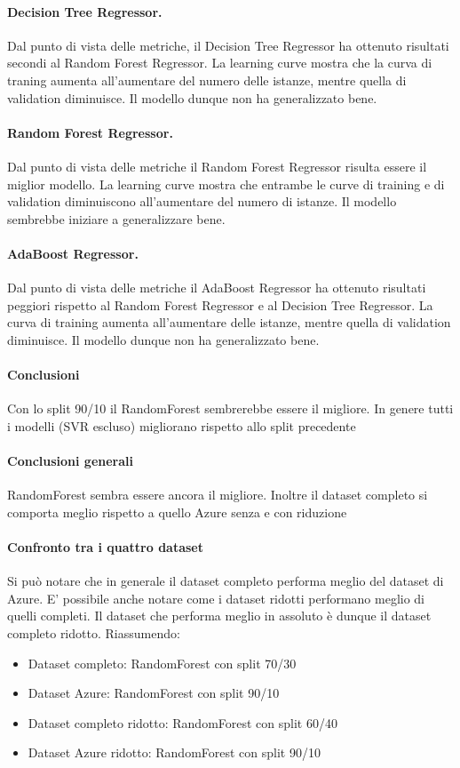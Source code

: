 \paragraph{\textbf{Decision Tree Regressor}.}
Dal punto di vista delle metriche, il Decision Tree Regressor ha ottenuto risultati secondi al Random Forest Regressor.
La learning curve mostra che la curva di traning aumenta all'aumentare del numero delle istanze, mentre quella di validation diminuisce. Il modello dunque non ha generalizzato bene.
\paragraph{\textbf{Random Forest Regressor}.}
Dal punto di vista delle metriche il Random Forest Regressor risulta essere il miglior modello.
La learning curve mostra che entrambe le curve di training e di validation diminuiscono all'aumentare del numero di istanze. Il modello sembrebbe iniziare a generalizzare bene.
\paragraph{\textbf{AdaBoost Regressor}.}
Dal punto di vista delle metriche il AdaBoost Regressor ha ottenuto risultati peggiori rispetto al Random Forest Regressor e al Decision Tree Regressor. La curva di training aumenta all'aumentare delle istanze, mentre quella di validation diminuisce. Il modello dunque non ha generalizzato bene.

\paragraph{\textbf{Conclusioni}} Con lo split 90/10 il RandomForest sembrerebbe essere il migliore. In genere tutti i modelli (SVR escluso) migliorano rispetto allo split precedente

\paragraph{\textbf{Conclusioni generali}}
RandomForest sembra essere ancora il migliore.
Inoltre il dataset completo si comporta meglio rispetto a quello Azure senza e con riduzione


\paragraph{Confronto tra i quattro dataset}
Si può notare che in generale il dataset completo performa meglio del dataset di Azure. E' possibile anche notare come i dataset ridotti performano meglio di quelli completi. Il dataset che performa meglio in assoluto è dunque il dataset completo ridotto.
Riassumendo:
\begin{itemize}
    \item Dataset completo: RandomForest con split 70/30
    \item Dataset Azure: RandomForest con split 90/10
    \item Dataset completo ridotto: RandomForest con split 60/40
    \item Dataset Azure ridotto: RandomForest con split 90/10
\end{itemize}